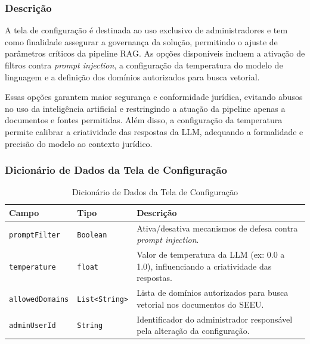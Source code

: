 \begin{description}
\subsubsection{Descrição}

A tela de configuração é destinada ao uso exclusivo de administradores e tem como finalidade assegurar a governança da solução, permitindo o ajuste de parâmetros críticos da pipeline RAG. As opções disponíveis incluem a ativação de filtros contra \emph{prompt injection}, a configuração da temperatura do modelo de linguagem e a definição dos domínios autorizados para busca vetorial.

Essas opções garantem maior segurança e conformidade jurídica, evitando abusos no uso da inteligência artificial e restringindo a atuação da pipeline apenas a documentos e fontes permitidas. Além disso, a configuração da temperatura permite calibrar a criatividade das respostas da LLM, adequando a formalidade e precisão do modelo ao contexto jurídico.

\subsubsection{Dicionário de Dados da Tela de Configuração}

\begin{table}[H]
  \centering
  \caption{Dicionário de Dados da Tela de Configuração}
  \label{tab:dd_tela_configuracao}
  \begin{tabular}{|p{3cm}|p{4cm}|p{8cm}|}
    \hline
    \textbf{Campo} & \textbf{Tipo} & \textbf{Descrição} \\ \hline
    \texttt{promptFilter} & \texttt{Boolean} & Ativa/desativa mecanismos de defesa contra \emph{prompt injection}. \\ \hline
    \texttt{temperature} & \texttt{float} & Valor de temperatura da LLM (ex: 0.0 a 1.0), influenciando a criatividade das respostas. \\ \hline
    \texttt{allowedDomains} & \texttt{List<String>} & Lista de domínios autorizados para busca vetorial nos documentos do SEEU. \\ \hline
    \texttt{adminUserId} & \texttt{String} & Identificador do administrador responsável pela alteração da configuração. \\ \hline
  \end{tabular}
\end{table}




\end{description}
